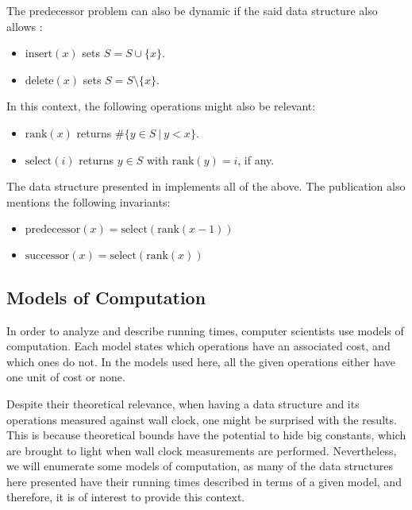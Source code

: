 The predecessor problem can also be dynamic if the said data structure also allows \cite{beame1999optimal}:
\begin{itemize}
    \item
    $\text{insert}(x)$ sets $S=S \cup \{x\}$.
    
    \item
    $\text{delete}(x)$ sets $S=S \setminus \{x\}$.
\end{itemize}

In this context, the following operations might also be relevant:
\begin{itemize}
    \item
    $\text{rank}(x)$ returns $\#\{ y \in S\ |\ y < x\}$.
    \item
    $\text{select}(i)$ returns $y \in S$ with $\text{rank}(y) = i$, if any.
\end{itemize}

The data structure presented in \cite{patrascu2014dynamic} implements all of the above. The publication also mentions the following invariants:
\begin{itemize}
    \item
    $\text{predecessor}(x) = \text{select}(\text{rank}(x - 1))$
    \item
    $\text{successor}(x) = \text{select}(\text{rank}(x))$
\end{itemize}

\subsection{Models of Computation}\label{sec:modelsofcomputation}

In order to analyze and describe running times, computer scientists use models of computation. Each model states which operations have an associated cost, and which ones do not.
In the models used here, all the given operations either have one unit of cost or none.

Despite their theoretical relevance, when having a data structure and its operations measured against wall clock, one might be surprised with the results.
This is because theoretical bounds have the potential to hide big constants, which are brought to light when wall clock measurements are performed.
Nevertheless, we will enumerate some models of computation, as many of the data structures here presented have their running times described in terms of a given model, and therefore, it is of interest to provide this context.

